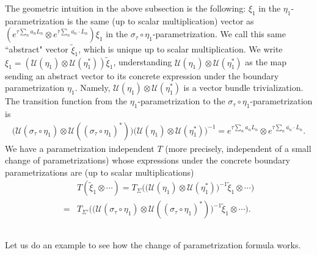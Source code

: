 \documentclass[12pt,a4paper,notitlepage]{article}
\theoremstyle{definition}
\theoremstyle{plain}
\newcommand{\mc}{\mathcal}
\newcommand{\wtd}{\widetilde}
\newcommand{\ovl}{\overline}
\numberwithin{equation}{section}
\begin{document}
The geometric intuition in the above subsection is the following: $\xi_1$ in the $\eta_1$-parametrization is the same (up to scalar multiplication) vector as $(e^{\tau\sum_n a_nL_n}\otimes e^{\ovl \tau\sum_n \ovl {a_n}\cdot\ovl L_n})\xi_1$ in the $\sigma_\tau\circ\eta_1$-parametrization.  We call this same ``abstract" vector $\wtd\xi_1$, which is unique up to scalar multiplication. We write $\xi_1=(\mc U(\eta_1)\otimes\mc U(\eta_1^*))\wtd \xi_1$, understanding $\mc U(\eta_1)\otimes\mc U(\eta_1^*)$ as the map sending an abstract vector to its concrete expression under the boundary parametrization $\eta_1$. Namely, $\mc U(\eta_1)\otimes\mc U(\eta_1^*)$ is a vector bundle trivialization.  The transition function from the $\eta_1$-parametrization to the $\sigma_\tau\circ\eta_1$-parametrization is
\begin{align}
\big(\mc U(\sigma_\tau\circ\eta_1)\otimes\mc U((\sigma_\tau\circ\eta_1)^*)\big)\big(\mc U(\eta_1)\otimes\mc U(\eta_1^*)\big)^{-1}=e^{\tau\sum_n a_nL_n}\otimes e^{\ovl \tau\sum_n \ovl {a_n}\cdot\ovl L_n}.	
\end{align}
We have a parametrization independent $T$ (more precisely, independent of a small change of parametrizations)  whose expressions under the concrete boundary parametrizations are (up to scalar multiplications)
\begin{align*}
&T(\wtd\xi_1\otimes\cdots)=T_\Sigma\Big(\big(\mc U(\eta_1)\otimes\mc U(\eta_1^*)\big)^{-1}\wtd\xi_1\otimes\cdots\Big)\\
=&T_{\Sigma'}\Big(\big(\mc U(\sigma_\tau\circ\eta_1)\otimes\mc U((\sigma_\tau\circ\eta_1)^*)\big)^{-1}\wtd\xi_1\otimes\cdots\Big).
\end{align*}







\subsection{}

Let us do an example to see how the change of parametrization formula works. 
\end{document}
